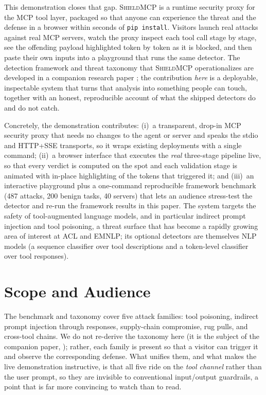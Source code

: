 \documentclass[11pt]{article}
\newcommand{\shield}{\textsc{ShieldMCP}}
\begin{document}
This demonstration closes that gap. \shield{} is a runtime security proxy for the
MCP tool layer, packaged so that anyone can experience the threat and the defense
in a browser within seconds of \texttt{pip install}. Visitors launch real attacks
against real MCP servers, watch the proxy inspect each tool call stage by stage, see
the offending payload highlighted token by token as it is blocked, and then paste
their own inputs into a playground that runs the same detector. The detection
framework and threat taxonomy that \shield{} operationalizes are developed in a
companion research paper \citep{yergattikar2026securing}; the contribution
\emph{here} is a deployable, inspectable
system that turns that analysis into something people can touch, together with an
honest, reproducible account of what the shipped detectors do and do not catch.

Concretely, the demonstration contributes: (i)~a transparent, drop-in MCP security
proxy that needs no changes to the agent or server and speaks the stdio and HTTP+SSE
transports, so it wraps existing deployments with a single command; (ii)~a browser
interface that executes the \emph{real} three-stage pipeline live, so that every
verdict is computed on the spot and each validation stage is animated with in-place
highlighting of the tokens that triggered it; and (iii)~an interactive playground
plus a one-command reproducible framework benchmark (487 attacks, 200 benign tasks,
40 servers) that lets an audience stress-test the detector and re-run the framework
results in this paper. The system targets the safety of tool-augmented language
models, and in particular indirect prompt injection and tool poisoning, a threat
surface that has become a rapidly growing area of interest at ACL and EMNLP; its
optional detectors are themselves NLP models (a sequence classifier over tool
descriptions and a token-level classifier over tool responses).

\section{Scope and Audience}

The benchmark and taxonomy cover five attack families: tool poisoning, indirect
prompt injection through responses, supply-chain compromise, rug pulls, and
cross-tool chains. We do not re-derive the taxonomy here (it is the subject of the
companion paper, \citealp{yergattikar2026securing}); rather, each family is present
so that a visitor can trigger it and
observe the corresponding defense. What unifies them, and what makes the live
demonstration instructive, is that all five ride on the \emph{tool channel} rather
than the user prompt, so they are invisible to conventional input/output guardrails,
a point that is far more convincing to watch than to read.
\end{document}
